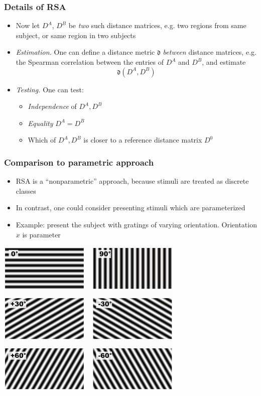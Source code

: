\documentclass{beamer}
\begin{document}
\begin{frame}
\frametitle{Details of RSA}
\begin{itemize}
\item Now let $D^A$, $D^B$ be \emph{two} such distance matrices, e.g. two regions from same subject, or same region in two subjects
\item \emph{Estimation.} One can define a distance metric  $\mathfrak{d}$ \emph{between} distance matrices, e.g. the Spearman correlation between the entries of $D^A$ and $D^B$,
and estimate
\[
\mathfrak{d}(D^A, D^B)
\]
\item \emph{Testing.}  One can test:
\begin{itemize}
\item \emph{Independence} of $D^A, D^B$
\item \emph{Equality} $D^A = D^B$
\item Which of $D^A, D^B$ is closer to a reference distance matrix $D^0$
\end{itemize}
\end{itemize}
\end{frame}


\begin{frame}
\frametitle{Comparison to parametric approach}
\begin{itemize}
\item RSA is a ``nonparametric'' approach, because stimuli are treated as discrete classes
\item In contrast, one could consider presenting stimuli which are parameterized
\item Example: present the subject with gratings of varying orientation.  Orientation $x$ is parameter
\end{itemize}
\begin{center}
\includegraphics[scale = 0.2]{grating_angle.png}
\end{center}
\end{frame}
\end{document}
